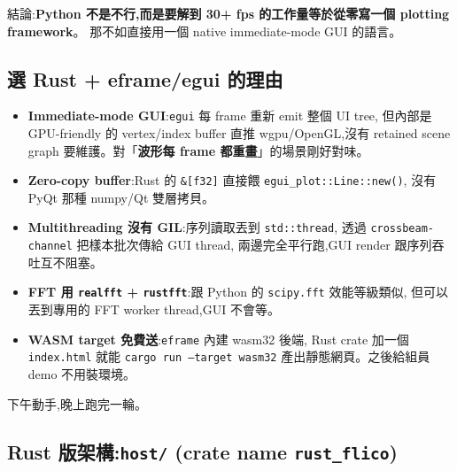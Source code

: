 結論:\textbf{Python 不是不行,而是要解到 30+ fps 的工作量等於從零寫一個 plotting framework}。
那不如直接用一個 native immediate-mode GUI 的語言。

\subsection*{選 Rust + eframe/egui 的理由}

\begin{itemize}[leftmargin=2em,itemsep=0pt]
  \item \textbf{Immediate-mode GUI}:\texttt{egui} 每 frame 重新 emit 整個 UI tree,
        但內部是 GPU-friendly 的 vertex/index buffer 直推 wgpu/OpenGL,沒有 retained scene graph
        要維護。對「\textbf{波形每 frame 都重畫}」的場景剛好對味。
  \item \textbf{Zero-copy buffer}:Rust 的 \texttt{\&[f32]} 直接餵 \texttt{egui\_plot::Line::new()},
        沒有 PyQt 那種 numpy/Qt 雙層拷貝。
  \item \textbf{Multithreading 沒有 GIL}:序列讀取丟到 \texttt{std::thread},
        透過 \texttt{crossbeam-channel} 把樣本批次傳給 GUI thread,
        兩邊完全平行跑,GUI render 跟序列吞吐互不阻塞。
  \item \textbf{FFT 用 \texttt{realfft} + \texttt{rustfft}}:跟 Python 的 \texttt{scipy.fft} 效能等級類似,
        但可以丟到專用的 FFT worker thread,GUI 不會等。
  \item \textbf{WASM target 免費送}:\texttt{eframe} 內建 wasm32 後端,
        Rust crate 加一個 \texttt{index.html} 就能 \texttt{cargo run --target wasm32}
        產出靜態網頁。之後給組員 demo 不用裝環境。
\end{itemize}

下午動手,晚上跑完一輪。

\subsection*{Rust 版架構:\texttt{host/} (crate name \texttt{rust\_flico})}

